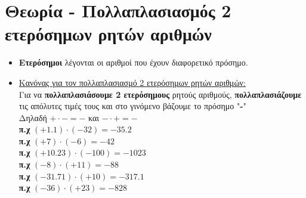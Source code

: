\documentclass[a4paper,10pt]{report}
\begin{document}
\section*{Θεωρία - Πολλαπλασιασμός 2 ετερόσημων ρητών αριθμών\hfill \small{}}
\begin{itemize}
 \item \textbf{Ετερόσημοι} λέγονται οι αριθμοί που έχουν διαφορετικό πρόσημο. 
 \item \underline{ Κανόνας για τον πολλαπλασιασμό 2 ετερόσημων ρητών αριθμών:} \\
       Για να \textbf{πολλαπλασιάσουμε 2 ετερόσημους} ρητούς αριθμούς, 
       \textbf{πολλαπλασιάζουμε} τις απόλυτες τιμές τους και στο γινόμενο βάζουμε το πρόσημο "\textbf{-}"\\
       Δηλαδή $+\cdot -=-$ και $-\cdot +=-$\\
       \textbf{π.χ} $(+1.1)\cdot(-32)=-35.2$\\
       \textbf{π.χ} $(+7)\cdot(-6)=-42$\\
       \textbf{π.χ} $(+10.23)\cdot(-100)=-1023$ \\
       \textbf{π.χ} $(-8)\cdot(+11)=-88$ \\
       \textbf{π.χ} $(-31.71)\cdot(+10)=-317.1$ \\
       \textbf{π.χ} $(-36)\cdot(+23)=-828$ \\
\end{itemize}
\end{document}
